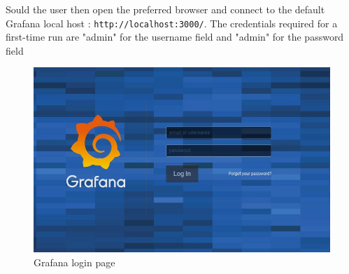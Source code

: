 Sould the user then open the preferred browser and connect to the default Grafana local host : \texttt{http://localhost:3000/}.
The credentials required for a first-time run are "admin" for the username field and "admin" for the password field
\begin{figure}[H]
\centering
\includegraphics[scale=0.65]{img/install/login.jpg}
\caption{Grafana login page}
\end{figure}